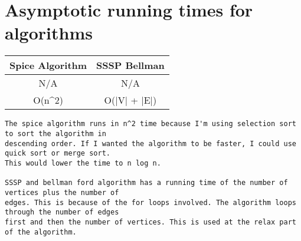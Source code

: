 \documentclass{article}
\begin{document}
\section{Asymptotic running times for algorithms}
\begin{center}
\begin{tabular}{||c c||} 
 \hline
Spice Algorithm & SSSP Bellman\\[0.10ex] 
 \hline \hline
N/A & N/A \\ 
 \hline
 O(n^2) & O(|V| + |E|)\\
 \hline
\end{tabular}
\end{center}
\begin{lstlisting}
The spice algorithm runs in n^2 time because I'm using selection sort to sort the algorithm in 
descending order. If I wanted the algorithm to be faster, I could use quick sort or merge sort. 
This would lower the time to n log n.

SSSP and bellman ford algorithm has a running time of the number of vertices plus the number of 
edges. This is because of the for loops involved. The algorithm loops through the number of edges 
first and then the number of vertices. This is used at the relax part of the algorithm.
\end{lstlisting}
\end{document}
